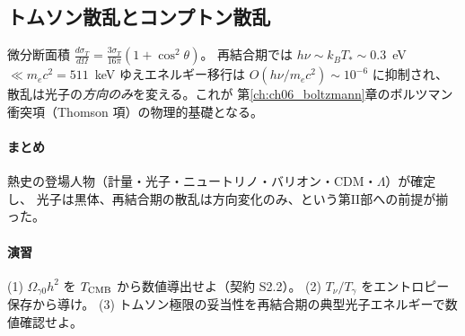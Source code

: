 \subsection{トムソン散乱とコンプトン散乱}
微分断面積 $\frac{d\sigma_T}{d\Omega}=\frac{3\sigma_T}{16\pi}(1+\cos^2\theta)$。
再結合期では $h\nu\sim k_BT_*\sim0.3$~eV $\ll m_ec^2=511$~keV ゆえエネルギー移行は
$O(h\nu/m_ec^2)\sim10^{-6}$ に抑制され、散乱は光子の\emph{方向のみ}を変える。これが
第\ref{ch:ch06_boltzmann}章のボルツマン衝突項（Thomson 項）の物理的基礎となる。

\paragraph{まとめ}
熱史の登場人物（計量・光子・ニュートリノ・バリオン・CDM・$\Lambda$）が確定し、
光子は黒体、再結合期の散乱は方向変化のみ、という第II部への前提が揃った。

\paragraph{演習}
(1) $\Omega_{\gamma0}h^2$ を $T_{\rm CMB}$ から数値導出せよ（契約 S2.2）。
(2) $T_\nu/T_\gamma$ をエントロピー保存から導け。
(3) トムソン極限の妥当性を再結合期の典型光子エネルギーで数値確認せよ。
